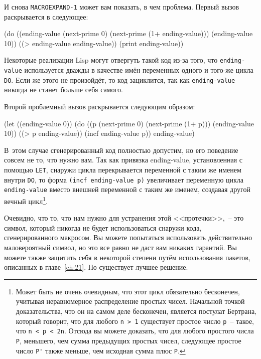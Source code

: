И снова \lstinline{MACROEXPAND-1} может вам показать, в чем проблема. Первый вызов
раскрывается в следующее:

\begin{myverb}
(do ((ending-value (next-prime 0) (next-prime (1+ ending-value)))
     (ending-value 10))
    ((> ending-value ending-value))
  (print ending-value))
\end{myverb}

Некоторые реализации Lisp могут отвергуть такой код из-за того, что \lstinline{ending-value}
используется дважды в качестве имён переменных одного и того-же цикла \lstinline{DO}. Если же
этого не произойдёт, то код зациклится, так как \lstinline{ending-value} никогда не станет
больше себя самого.

Второй проблемный вызов раскрывается следующим образом:

\begin{myverb}
(let ((ending-value 0))
  (do ((p (next-prime 0) (next-prime (1+ p)))
       (ending-value 10))
      ((> p ending-value))
    (incf ending-value p))
  ending-value)
\end{myverb}

В~этом случае сгенерированный код полностью допустим, но его поведение совсем не то, что
нужно вам. Так как привязка ending-value, установленная с помощью \lstinline{LET}, снаружи
цикла перекрывается переменной с таким же именем внутри \lstinline{DO}, то форма 
\lstinline{(incf ending-value p)} увеличивает переменную цикла \lstinline{ending-value} вместо внешней
переменной с таким же именем, создавая другой вечный цикл\footnote{Может быть не очень
  очевидным, что этот цикл обязательно бесконечен, учитывая неравномерное распределение
  простых чисел. Начальной точкой доказательства, что он на самом деле бесконечен,
  является постулат Бертрана, который говорит, что для любого \lstinline{n > 1} существует
  простое число \lstinline{p}~-- такое, что \lstinline!n < p < 2n!. Отсюда вы можете доказать, что
  для любого простого числа \lstinline{P}, меньшего, чем сумма предыдущих простых чисел,
  следующее простое число \lstinline{P'} также меньше, чем исходная сумма плюс \lstinline{P}.}\hspace{\footnotenegspace}.

Очевидно, что то, что нам нужно для устранения этой <<протечки>>,~-- это символ, который
никогда не будет использоваться снаружи кода, сгенерированного макросом. Вы можете
попытаться использовать действительно маловероятный символ, но это все равно не даст вам
никаких гарантий. Вы можете также защитить себя в некоторой степени путём использования
пакетов, описанных в главе~\ref{ch:21}. Но существует лучшее решение.

